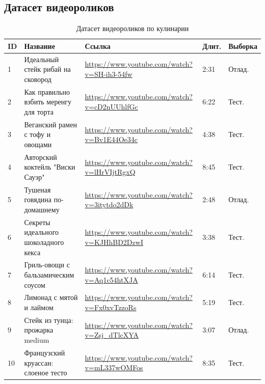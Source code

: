 \documentclass[oneside,a4paper,14pt]{extarticle} %
\begin{document}
		\subsection{Датасет видеороликов}
		\begin{table}[H]
			\centering
			\caption{Датасет видеороликов по кулинарии}
			\begin{tabularx}{\textwidth}{|p{0.4cm}|p{5.5cm}|p{5cm}|p{1.5cm}|p{1cm}|}
				\hline
				\textbf{ID} & \textbf{Название} & \textbf{Ссылка} & \textbf{Длит.} & \textbf{Выборка} \\ \hline
				1 & Идеальный стейк рибай на сковород & \url{https://www.youtube.com/watch?v=SH-ih3-54fw} & 2:31 & Отлад. \\ \hline
				2 & Как правильно взбить меренгу для торта & \url{https://www.youtube.com/watch?v=cD2nUUhlfGc} & 6:22 & Тест. \\ \hline
				3 & Веганский рамен с тофу и овощами & \url{https://www.youtube.com/watch?v=Bv1E44Oe34c} & 4:38 & Тест. \\ \hline
				4 & Авторский коктейль "Виски Сауэр" & \url{https://www.youtube.com/watch?v=lHrVIjtRgxQ} & 8:45 & Тест. \\ \hline
				5 & Тушеная говядина по-домашнему & \url{https://www.youtube.com/watch?v=3itytdo2dDk} & 2:48 & Отлад. \\ \hline
				6 & Секреты идеального шоколадного кекса & \url{https://www.youtube.com/watch?v=KJHhBD2DzwI} & 3:38 & Тест. \\ \hline
				7 & Гриль-овощи с бальзамическим соусом & \url{https://www.youtube.com/watch?v=Aq1c54htXJA} & 6:14 & Тест. \\ \hline
				8 & Лимонад с мятой и лаймом & \url{https://www.youtube.com/watch?v=Fx0xvTzzoRs} & 5:19 & Тест. \\ \hline
				9 & Стейк из тунца: прожарка medium & \url{https://www.youtube.com/watch?v=Zsj_dTlcXYA} & 3:07 & Отлад. \\ \hline
				10 & Французский круассан: слоеное тесто & \url{https://www.youtube.com/watch?v=mL337wOMFos} & 8:35 & Тест. \\ \hline
			\end{tabularx}
		\end{table}
\end{document}
